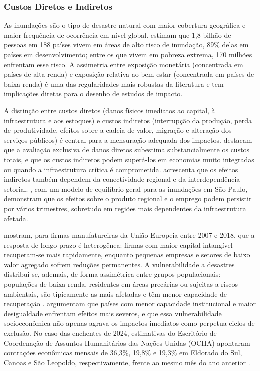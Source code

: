 \documentclass[a4paper,12pt]{article}
\begin{document}
\subsubsection{Custos Diretos e Indiretos}

As inundações são o tipo de desastre natural com maior cobertura geográfica e maior
frequência de ocorrência em nível global.  estimam que 1,8
bilhão de pessoas em 188 países vivem em áreas de alto risco de inundação, 89\% delas
em países em desenvolvimento; entre os que vivem em pobreza extrema, 170 milhões
enfrentam esse risco. A assimetria entre exposição monetária (concentrada em países de
alta renda) e exposição relativa ao bem-estar (concentrada em países de baixa renda)
é uma das regularidades mais robustas da literatura \cite{mcdermott2022} e tem
implicações diretas para o desenho de estudos de impacto.

A distinção entre custos diretos (danos físicos imediatos ao capital, à infraestrutura e
aos estoques) e custos indiretos (interrupção da produção, perda de produtividade, efeitos
sobre a cadeia de valor, migração e alteração dos serviços públicos) é central para a
mensuração adequada dos impactos.  destacam que a avaliação
exclusiva de danos diretos subestima substancialmente os custos totais, e que os custos
indiretos podem superá-los em economias muito integradas ou quando a infraestrutura
crítica é comprometida.  acrescenta que os efeitos indiretos
também dependem da conectividade regional e da interdependência setorial.
, com um modelo de equilíbrio geral para as inundações
em São Paulo, demonstram que os efeitos sobre o produto regional e o emprego podem
persistir por vários trimestres, sobretudo em regiões mais dependentes da infraestrutura
afetada.

 mostram, para firmas manufatureiras da União Europeia entre
2007 e 2018, que a resposta de longo prazo é heterogênea: firmas com maior capital
intangível recuperam-se mais rapidamente, enquanto pequenas empresas e setores de baixo
valor agregado sofrem reduções permanentes. A vulnerabilidade a desastres distribui-se,
ademais, de forma assimétrica entre grupos populacionais: populações de baixa renda,
residentes em áreas precárias ou sujeitas a riscos ambientais, são tipicamente as mais
afetadas e têm menor capacidade de recuperação \cite{alderman2012, lima2018}.
 argumentam que países com menor capacidade institucional e
maior desigualdade enfrentam efeitos mais severos, e que essa vulnerabilidade
socioeconômica não apenas agrava os impactos imediatos como perpetua ciclos de
exclusão. No caso das enchentes de 2024, estimativas do Escritório de Coordenação de Assuntos
Humanitários das Nações Unidas (OCHA) apontaram contrações econômicas mensais de
36,3\%, 19,8\% e 19,3\% em Eldorado do Sul, Canoas e São Leopoldo, respectivamente,
frente ao mesmo mês do ano anterior \cite{ocha2024}.
\end{document}
